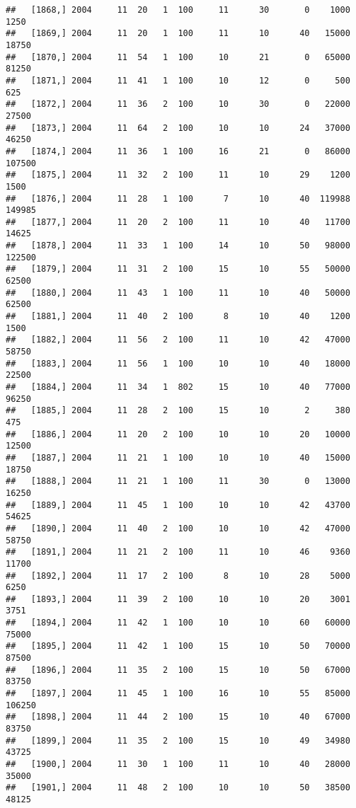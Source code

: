 \documentclass{article}\usepackage[]{graphicx}\usepackage[]{color}
\makeatletter
\newenvironment{kframe}{%
 \def\at@end@of@kframe{}%
 \ifinner\ifhmode%
  \def\at@end@of@kframe{\end{minipage}}%
  \begin{minipage}{\columnwidth}%
 \fi\fi%
 \def\FrameCommand##1{\hskip\@totalleftmargin \hskip-\fboxsep
 \colorbox{shadecolor}{##1}\hskip-\fboxsep
     \hskip-\linewidth \hskip-\@totalleftmargin \hskip\columnwidth}%
 \MakeFramed {\advance\hsize-\width
   \@totalleftmargin\z@ \linewidth\hsize
   \@setminipage}}%
 {\par\unskip\endMakeFramed%
 \at@end@of@kframe}
\newenvironment{knitrout}{}{} %
\makeatother
\begin{document}
\begin{knitrout}
\begin{kframe}
\begin{verbatim}
##   [1868,] 2004     11  20   1  100     11      30       0    1000    1250
##   [1869,] 2004     11  20   1  100     11      10      40   15000   18750
##   [1870,] 2004     11  54   1  100     10      21       0   65000   81250
##   [1871,] 2004     11  41   1  100     10      12       0     500     625
##   [1872,] 2004     11  36   2  100     10      30       0   22000   27500
##   [1873,] 2004     11  64   2  100     10      10      24   37000   46250
##   [1874,] 2004     11  36   1  100     16      21       0   86000  107500
##   [1875,] 2004     11  32   2  100     11      10      29    1200    1500
##   [1876,] 2004     11  28   1  100      7      10      40  119988  149985
##   [1877,] 2004     11  20   2  100     11      10      40   11700   14625
##   [1878,] 2004     11  33   1  100     14      10      50   98000  122500
##   [1879,] 2004     11  31   2  100     15      10      55   50000   62500
##   [1880,] 2004     11  43   1  100     11      10      40   50000   62500
##   [1881,] 2004     11  40   2  100      8      10      40    1200    1500
##   [1882,] 2004     11  56   2  100     11      10      42   47000   58750
##   [1883,] 2004     11  56   1  100     10      10      40   18000   22500
##   [1884,] 2004     11  34   1  802     15      10      40   77000   96250
##   [1885,] 2004     11  28   2  100     15      10       2     380     475
##   [1886,] 2004     11  20   2  100     10      10      20   10000   12500
##   [1887,] 2004     11  21   1  100     10      10      40   15000   18750
##   [1888,] 2004     11  21   1  100     11      30       0   13000   16250
##   [1889,] 2004     11  45   1  100     10      10      42   43700   54625
##   [1890,] 2004     11  40   2  100     10      10      42   47000   58750
##   [1891,] 2004     11  21   2  100     11      10      46    9360   11700
##   [1892,] 2004     11  17   2  100      8      10      28    5000    6250
##   [1893,] 2004     11  39   2  100     10      10      20    3001    3751
##   [1894,] 2004     11  42   1  100     10      10      60   60000   75000
##   [1895,] 2004     11  42   1  100     15      10      50   70000   87500
##   [1896,] 2004     11  35   2  100     15      10      50   67000   83750
##   [1897,] 2004     11  45   1  100     16      10      55   85000  106250
##   [1898,] 2004     11  44   2  100     15      10      40   67000   83750
##   [1899,] 2004     11  35   2  100     15      10      49   34980   43725
##   [1900,] 2004     11  30   1  100     11      10      40   28000   35000
##   [1901,] 2004     11  48   2  100     10      10      50   38500   48125

\end{verbatim}
\end{kframe}
\end{knitrout}
\end{document}
